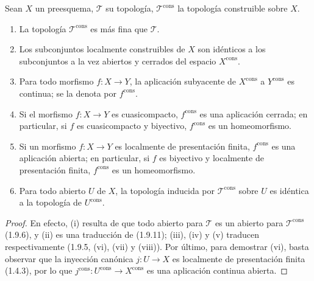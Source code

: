 \begin{proposition}[1.9.14]
\label{IV.1.9.14-fr}
Sean $X$ un preesquema, $\mathscr T$ su topología,
$\mathscr T^{\mathrm{cons}}$ la topología construible sobre $X$.
\begin{enumerate}
  \item[\textup{(i)}] La topología $\mathscr T^{\mathrm{cons}}$ es más fina que
  $\mathscr T$.
  \item[\textup{(ii)}] Los subconjuntos localmente construibles de $X$ son idénticos
  a los subconjuntos a la vez abiertos y cerrados del espacio $X^{\mathrm{cons}}$.
  \item[\textup{(iii)}] Para todo morfismo $f:X\to Y$, la aplicación subyacente de
  $X^{\mathrm{cons}}$ a $Y^{\mathrm{cons}}$ es continua; se la denota por
  $f^{\mathrm{cons}}$.
  \item[\textup{(iv)}] Si el morfismo $f:X\to Y$ es cuasicompacto,
  $f^{\mathrm{cons}}$ es una aplicación cerrada; en particular, si $f$
  es cuasicompacto y biyectivo, $f^{\mathrm{cons}}$ es un homeomorfismo.
  \item[\textup{(v)}] Si un morfismo $f:X\to Y$ es localmente de presentación
  finita, $f^{\mathrm{cons}}$ es una aplicación abierta; en particular,
  si $f$ es biyectivo y localmente de presentación finita,
  $f^{\mathrm{cons}}$ es un homeomorfismo.
  \item[\textup{(vi)}] Para todo abierto $U$ de $X$, la topología inducida por
  $\mathscr T^{\mathrm{cons}}$ sobre $U$ es idéntica a la topología de
  $U^{\mathrm{cons}}$.
\end{enumerate}
\end{proposition}

\begin{proof}
En efecto, (i) resulta de que todo abierto para $\mathscr T$ es un abierto
para $\mathscr T^{\mathrm{cons}}$ (1.9.6), y (ii) es una traducción de
(1.9.11); (iii), (iv) y (v) traducen respectivamente (1.9.5, (vi), (vii)
y (viii)). Por último, para demostrar (vi), basta observar que la inyección
canónica $j:U\to X$ es localmente de presentación finita (1.4.3), por lo que
$j^{\mathrm{cons}}:U^{\mathrm{cons}}\to X^{\mathrm{cons}}$ es una
aplicación continua abierta.
\end{proof}

